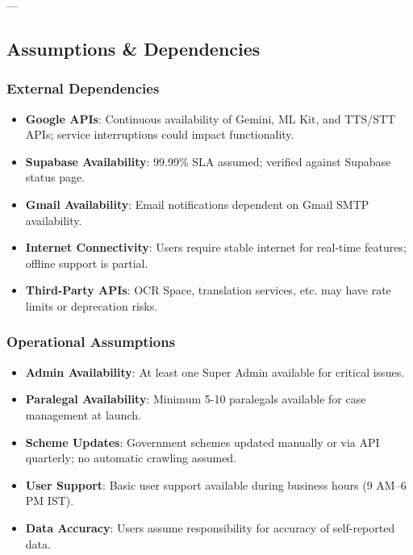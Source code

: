 ---

\subsection{Assumptions \& Dependencies}

\subsubsection{External Dependencies}
\begin{itemize}
    \item \textbf{Google APIs}: Continuous availability of Gemini, ML Kit, and TTS/STT APIs; service interruptions could impact functionality.
    \item \textbf{Supabase Availability}: 99.99\% SLA assumed; verified against Supabase status page.
    \item \textbf{Gmail Availability}: Email notifications dependent on Gmail SMTP availability.
    \item \textbf{Internet Connectivity}: Users require stable internet for real-time features; offline support is partial.
    \item \textbf{Third-Party APIs}: OCR Space, translation services, etc. may have rate limits or deprecation risks.
\end{itemize}

\subsubsection{Operational Assumptions}
\begin{itemize}
    \item \textbf{Admin Availability}: At least one Super Admin available for critical issues.
    \item \textbf{Paralegal Availability}: Minimum 5-10 paralegals available for case management at launch.
    \item \textbf{Scheme Updates}: Government schemes updated manually or via API quarterly; no automatic crawling assumed.
    \item \textbf{User Support}: Basic user support available during business hours (9 AM--6 PM IST).
    \item \textbf{Data Accuracy}: Users assume responsibility for accuracy of self-reported data.
\end{itemize}


